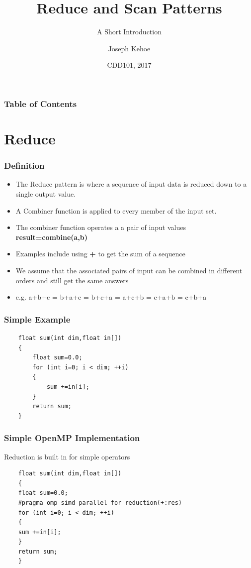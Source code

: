 \documentclass{beamer}
\title[Reduce and Scan] %
{Reduce and Scan Patterns}
\subtitle{A Short Introduction}
\author[Dr. Joseph Kehoe] %
{Joseph Kehoe\inst{1}}
\institute[IT Carlow] %
{
	\inst{1}%
	Department of Computing and Networking\\
	Institute of Technology Carlow
}
\date[ITC 2017] %
{CDD101, 2017}
\begin{document}
 
\frame{\titlepage}
 
 
 
 \begin{frame}
 	\frametitle{Table of Contents}
 	\tableofcontents
 \end{frame}
 
 
 \section{Reduce}
\begin{frame}
\frametitle{Definition}

\begin{itemize}
	\item The Reduce pattern is where a sequence of input data is reduced down to a single output value.
	\item A Combiner function is applied to every member of the input set.
	\item The combiner function operates a a pair of input values \textbf{result=combine(a,b)}
	\item Examples include using \textbf{+} to get the sum of a sequence
	\item We assume that the associated pairs of input can be combined in different orders and still get the same answers
	\item e.g.  a+b+c = b+a+c = b+c+a = a+c+b = c+a+b = c+b+a
\end{itemize}
\end{frame}


 \begin{frame}[fragile=singleslide]
 	\frametitle{Simple Example}
\begin{lstlisting}
 	float sum(int dim,float in[])
 	{
	 	float sum=0.0;
 		for (int i=0; i < dim; ++i)
 		{
 			sum +=in[i];
 		}
 		return sum;
 	}
 \end{lstlisting}
 \end{frame}
  \begin{frame}[fragile=singleslide]
  	\frametitle{Simple OpenMP Implementation}
  	Reduction is built in for simple operators
  	\begin{lstlisting}
  	float sum(int dim,float in[])
  	{
  	float sum=0.0;
  	#pragma omp simd parallel for reduction(+:res)
  	for (int i=0; i < dim; ++i)
  	{
  	sum +=in[i];
  	}
  	return sum;
  	}
  	\end{lstlisting}
  \end{frame}
\end{document}
